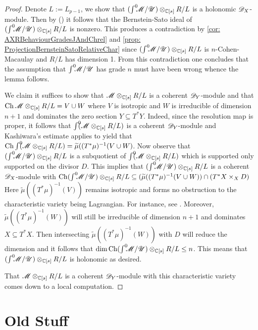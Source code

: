 \begin{proof}
  Denote $L := L_{p-1}$, we show that $(\int^0 \mkern -8mu\mathscr{M}/ \mathscr{U})\otimes_{\mathbb{C}[s]}R/L$ is a holonomic $\mathscr{D}_X$-module.
  Then by () it follows that the Bernstein-Sato ideal of $(\int^0 \mkern -8mu\mathscr{M}/ \mathscr{U})\otimes_{\mathbb{C}[s]}R/L$ is nonzero.
  This produces a contradiction by \cref{cor: AXRBehaviourGradesJAndChrel} and \cref{prop: ProjectionBernsteinSatoRelativeChar} since $(\int^0 \mkern -8mu\mathscr{M}/ \mathscr{U})\otimes_{\mathbb{C}[s]}R/L$ is $n$-Cohen-Macaulay and $R/L$ has dimension 1.
  From this contradiction one concludes that the assumption that $\int^0 \mkern -8mu\mathscr{M}/\mathscr{U}$ has grade $n$ must have been wrong whence the lemma follows.

  We claim it suffices to show that $\mathscr{M}\otimes_{\mathbb{C}[s]}R/L$ is a coherent $\mathscr{D}_Y$-module and that $\operatorname{Ch}\mathscr{M}\otimes_{\mathbb{C}[s]}R/L = V\cup W $ where $V$ is isotropic and $W$ is irreducible of dimension $n+1$ and dominates the zero section $Y\subseteq T^*Y$.
  Indeed, since the resolution map is proper, it follows that $\int^0 \mkern -8mu(\mathscr{M} \otimes_{\mathbb{C}[s]} R/L)$ is a coherent $\mathscr{D}_Y$-module and Kashiwara's estimate applies to yield that $\operatorname{Ch}\int^0 \mkern -8mu(\mathscr{M} \otimes_{\mathbb{C}[s]} R/L)= \widetilde{\mu}((T^*\mu)^{-1}(V\cup W)$.
  Now observe that $(\int^0 \mkern -8mu\mathscr{M}/ \mathscr{U})\otimes_{\mathbb{C}[s]}R/L$ is a subquotient of $\int^0 \mkern -8mu (\mathscr{M} \otimes_{\mathbb{C}[s]} R/L)$ which is supported only supported on the divisor $D$.
  This implies that $(\int^0 \mkern -8mu\mathscr{M}/ \mathscr{U})\otimes_{\mathbb{C}[s]}R/L$ is a coherent $\mathscr{D}_X$-module with $\operatorname{Ch}(\int^0 \mkern -8mu\mathscr{M}/ \mathscr{U})\otimes_{\mathbb{C}[s]}R/L \subseteq (\widetilde{\mu}((T^*\mu)^{-1}(V\cup W)) \cap (T^*X\times_X D)$
  Here $\widetilde{\mu}((T^*\mu)^{-1}(V))$ remains isotropic and forms no obstruction to the characteristic variety being Lagrangian. For instance, see \cite[proposition 4.9]{kashiwara1976b}.
  Moreover, $\widetilde{\mu}((T^*\mu)^{-1}(W))$ will still be irreducible of dimension $n+1$ and dominates $X\subseteq T^*X$.
  Then intersecting $\widetilde{\mu}((T^*\mu)^{-1}(W))$ with $D$ will reduce the dimension and it follows that $\dim \operatorname{Ch} (\int^0 \mkern -8mu\mathscr{M}/ \mathscr{U})\otimes_{\mathbb{C}[s]}R/L \leq n$.
  This means that $(\int^0 \mkern -8mu\mathscr{M}/ \mathscr{U})\otimes_{\mathbb{C}[s]}R/L$ is holonomic as desired.

  That $\mathscr{M}\otimes_{\mathbb{C}[s]}R/L$ is a coherent $\mathscr{D}_Y$-module with this characteristic variety comes down to a local computation. 

\end{proof}
\newpage
\section{Old Stuff}
